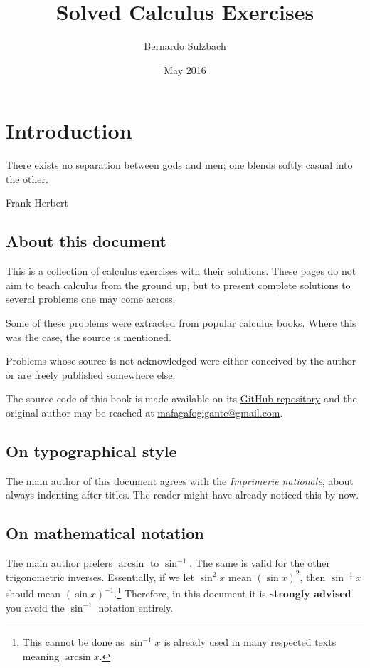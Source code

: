 \documentclass[a4paper, titlepage]{article}
\title{Solved Calculus Exercises}
\author{Bernardo Sulzbach}
\date{May 2016}
\begin{document}
\maketitle

\tableofcontents

\section{Introduction}

\setlength{\epigraphwidth}{3in}
\epigraph{There exists no separation between gods and men; one blends softly
casual into the other.}{Frank Herbert}

\subsection{About this document}

This is a collection of calculus exercises with their solutions. These pages do
not aim to teach calculus from the ground up, but to present complete solutions
to several problems one may come across.

Some of these problems were extracted from popular calculus books.
Where this was the case, the source is mentioned.

Problems whose source is not acknowledged were either conceived by
the author or are freely published somewhere else.

The source code of this book is made available on its
\href{https://github.com/mafagafogigante/solved-calculus-exercises}{GitHub
repository} and the original author may be reached at
\href{mailto:mafagafogigante@gmail.com}{mafagafogigante@gmail.com}.

\subsection{On typographical style}

The main author of this document agrees with the \textit{Imprimerie nationale},
about always indenting after titles. The reader might have already noticed this
by now.

\subsection{On mathematical notation}

The main author prefers \(\arcsin\) to \(\sin^{-1}\). The same is valid for the
other trigonometric inverses. Essentially, if we let \(\sin^{2} x\) mean
\(\left(\sin x \right)^2\), then \(\sin^{-1} x\) should mean
\(\left(\sin x\right)^{-1}\).\footnote{This cannot be done as \(\sin^{-1} x\)
is already used in many respected texts meaning \(\arcsin x\).} Therefore, in
this document it is \textbf{strongly advised} you avoid the \(\sin^{-1}\)
notation entirely.
\end{document}
